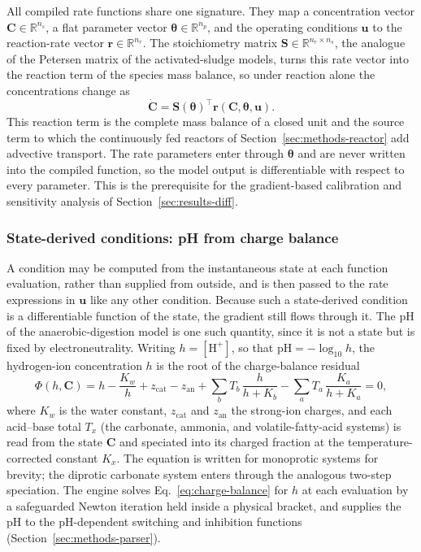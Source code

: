\documentclass{article}
\begin{document}
All compiled rate functions share one signature. They map a concentration vector \(\mathbf{C}\in\mathbb{R}^{n_s}\), a flat parameter vector \(\boldsymbol{\theta}\in\mathbb{R}^{n_p}\), and the operating conditions \(\mathbf{u}\) to the reaction-rate vector \(\mathbf{r}\in\mathbb{R}^{n_r}\). The stoichiometry matrix \(\mathbf{S}\in\mathbb{R}^{n_r\times n_s}\), the analogue of the Petersen matrix of the activated-sludge models, turns this rate vector into the reaction term of the species mass balance, so under reaction alone the concentrations change as
\begin{equation}
  \dot{\mathbf{C}} = \mathbf{S}(\boldsymbol{\theta})^\top \mathbf{r}(\mathbf{C}, \boldsymbol{\theta}, \mathbf{u}).
  \label{eq:massbalance}
\end{equation}
This reaction term is the complete mass balance of a closed unit and the source term to which the continuously fed reactors of Section~\ref{sec:methods-reactor} add advective transport. The rate parameters enter through \(\boldsymbol{\theta}\) and are never written into the compiled function, so the model output is differentiable with respect to every parameter. This is the prerequisite for the gradient-based calibration and sensitivity analysis of Section~\ref{sec:results-diff}.

\subsubsection{State-derived conditions: pH from charge balance}
\label{sec:methods-conditions}

A condition may be computed from the instantaneous state at each function evaluation, rather than supplied from outside, and is then passed to the rate expressions in $\mathbf{u}$ like any other condition. Because such a state-derived condition is a differentiable function of the state, the gradient still flows through it. The pH of the anaerobic-digestion model is one such quantity, since it is not a state but is fixed by electroneutrality. Writing \(h=[\text{H}^+]\), so that \(\text{pH}=-\log_{10} h\), the hydrogen-ion concentration \(h\) is the root of the charge-balance residual
\begin{equation}
  \Phi(h,\mathbf{C}) = h - \frac{K_w}{h} + z_{\mathrm{cat}} - z_{\mathrm{an}}
    + \sum_{b} T_b\,\frac{h}{h+K_b}
    - \sum_{a} T_a\,\frac{K_a}{h+K_a} = 0,
  \label{eq:charge-balance}
\end{equation}
where \(K_w\) is the water constant, \(z_{\mathrm{cat}}\) and \(z_{\mathrm{an}}\) the strong-ion charges, and each acid--base total \(T_x\) (the carbonate, ammonia, and volatile-fatty-acid systems) is read from the state \(\mathbf{C}\) and speciated into its charged fraction at the temperature-corrected constant \(K_x\). The equation is written for monoprotic systems for brevity; the diprotic carbonate system enters through the analogous two-step speciation. The engine solves Eq.~\eqref{eq:charge-balance} for \(h\) at each evaluation by a safeguarded Newton iteration held inside a physical bracket, and supplies the pH to the pH-dependent switching and inhibition functions (Section~\ref{sec:methods-parser}). 
\end{document}
